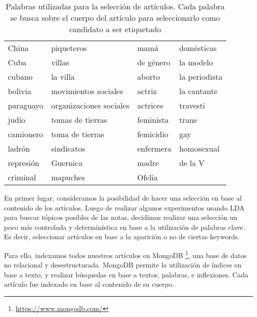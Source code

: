 \begin{table}[t]
    \centering
    \begin{tabular}{l  l  l  l}
    \hline
    China        &  piqueteros              &  mamá                & domésticas            \\
    Cuba         &  villas                  &  de género           & la modelo             \\
    cubano       &  la villa                &  aborto              & la periodista         \\
    bolivia      &  movimientos sociales    &  actriz              & la cantante           \\
    paraguayo    &  organizaciones sociales &  actrices            & travesti              \\
    judío        &  tomas de tierras        &  feminista           & trans                 \\
    camionero    &  toma de tierras         &  femicidio           & gay                   \\
    ladrón       &  sindicatos              &  enfermera           & homosexual            \\
    represión    &  Guernica                &  madre               & de la V               \\
    criminal     &  mapuches                &  Ofelia              &                       \\
    \hline
    \end{tabular}
    \caption{Palabras utilizadas para la selección de artículos. Cada palabra se busca sobre el cuerpo del artículo para seleccionarlo como candidato a ser etiquetado}
    \label{tab:palabras_articulos}
\end{table}
En primer lugar, consideramos la posibilidad de hacer una selección en base al contenido de los artículos. Luego de realizar algunos experimentos usando LDA \cite{blei2003latent} para buscar tópicos posibles de las notas, decidimos realizar una selección un poco más controlada y determinística en base a la utilización de palabras clave. Es decir, seleccionar artículos en base a la aparición o no de ciertas keywords.

Para ello, indexamos todos nuestros artículos en MongoDB \footnote{\url{https://www.mongodb.com/}}, una base de datos no relacional y desestructurada. MongoDB permite la utilización de índices en base a texto, y realizar búsquedas en base a textos, palabras, e inflexiones. Cada artículo fue indexado en base al contenido de su cuerpo.

